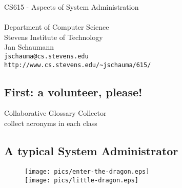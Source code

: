 \documentclass[xga]{xdvislides}
\begin{document}
\setfontphv

\lhead{\slidetitle}				%
\cfoot{\relax}					%
\rfoot{\Gray{\today}}

\vspace*{\fill}
\begin{center}
	\Hugesize
		CS615 - Aspects of System Administration\\ [1em]
	\hspace*{5mm}\blueline\\ [1em]
	\Normalsize
		Department of Computer Science\\
		Stevens Institute of Technology\\
		Jan Schaumann\\
		\verb+jschauma@cs.stevens.edu+ \\
		\verb+http://www.cs.stevens.edu/~jschauma/615/+
\end{center}
\vspace*{\fill}

\subsection{First: a volunteer, please!}
\vspace*{\fill}
\Huge
\begin{center}
Collaborative Glossary Collector \\
collect acronyms in each class
\end{center}
\Normalsize
\vspace*{\fill}

\subsection{A typical System Administrator}
\vspace*{\fill}
\begin{figure}[hb]
	\begin{center}
		\texttt{[image: pics/enter-the-dragon.eps]} \\
		\texttt{[image: pics/little-dragon.eps]} \\
	\end{center}
\end{figure}
\vspace*{\fill}
\end{document}
